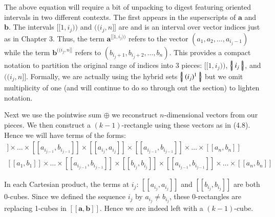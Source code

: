 The above equation will require a bit of unpacking to digest featuring oriented intervals in two different contexts.
The first appears in the superscripts of $\boldsymbol{a}$ and $\boldsymbol{b}$. 
The intervals $[\![1, i_j)\!)$ and $(\!(i_j, n]\!]$ are  and is an interval over vector indices just as in Chapter 3.
Thus, the term $\boldsymbol{a}^{[\![1,i_j)\!)}$ refers to the vector $(a_1, a_2, \ldots, a_{i_j-1})$ 
while the term $\boldsymbol{b}^{(\!(i_j,n]\!]}$ refers to $(b_{i_j+1}, b_{i_j+2}, \ldots, b_{n})$.
This provides a compact notation to partition the original range of indices into 3 pieces: $[\![ 1,i_j )\!)$, $\left\{ \! \left| \; i_j \; \right| \! \right\}$, and $(\!(i_j, n]\!]$.
Formally, we are actually using the hybrid sets $\left\{ \! \left| \; (i_j)^1 \; \right| \! \right\}$ but we omit multiplicity of one (and will continue to do so through out the section) to lighten notation.


Next we use the pointwise sum $\oplus$ we reconstruct $n$-dimensional vectors from our pieces.
We then construct a $(k-1)$-rectangle using these vectors as in (4.8).
Hence we will have terms of the forms:
\begin{align}
	[\![a_1, b_1]\!]
	\times \ldots \times
	[\![a_{i_{j-1}}, b_{i_{j-1}}]\!]
	\times
	[\![a_{i_j}, a_{i_j}]\!]
	\times
	[\![a_{i_{j-1}}, b_{i_{j-1}}]\!]
	\times \ldots \times
	[\![a_n, b_n]\!]
	\\
	[\![a_1, b_1]\!]
	\times \ldots \times
	[\![a_{i_{j-1}}, b_{i_{j-1}}]\!]
	\times
	[\![b_{i_j}, b_{i_j}]\!]
	\times
	[\![a_{i_{j-1}}, b_{i_{j-1}}]\!]
	\times \ldots \times
	[\![a_n, b_n]\!]
\end{align}


In each Cartesian product, the terms at $i_j$: $[\![a_{i_j}, a_{i_j}]\!]$ and $[\![b_{i_j}, b_{i_j}]\!]$ are both 0-cubes.
Since we defined the sequence $i_j$ by $a_{i_j} \neq b_{i_j}$, 
these 0-rectangles are replacing 1-cubes in $[\![\boldsymbol{a}, \boldsymbol{b}]\!]$.
Hence we are indeed left with a $(k-1)$-cube.




